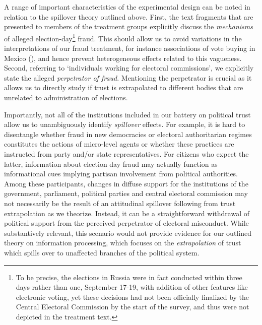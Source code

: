 \documentclass[11pt, ngerman,english,a4]{article}
\begin{document}
\doublespacing


A range of important characteristics of the experimental design can be noted in relation to the spillover theory outlined above.
First, the text fragments that are presented to members of the treatment groups explicitly discuss the \textit{mechanisms} of alleged election-day\footnote{To be precise, the elections in Russia were in fact conducted within three days rather than one, September 17-19, with addition of other features like electronic voting, yet these decisions had not been officially finalized by the Central Electoral Commission by the start of the survey, and thus were not depicted in the treatment text.} fraud. 
This should allow us to avoid variations in the interpretations of our fraud treatment, for instance associations of vote buying in Mexico (\citealt{Cantu2019a}), and hence prevent heterogeneous effects related to this vagueness. 
Second, referring to `individuals working for electoral commissions', we explicitly state the alleged \textit{perpetrator of fraud}. 
Mentioning the perpetrator is crucial as it allows us to directly study if trust is extrapolated to different bodies that are unrelated to administration of elections. 

Importantly, not all of the institutions included in our battery on political trust allow us to unambiguously identify \textit{spillover} effects. 
For example, it is hard to disentangle whether fraud in new democracies or electoral authoritarian regimes constitutes the actions of micro-level agents or whether these practices are instructed from party and/or state representatives. 
For citizens who expect the latter, information about election day fraud may actually function as informational cues implying partisan involvement from political authorities. 
Among these participants, changes in diffuse support for the institutions of the government, parliament, political parties and central electoral commission may not necessarily be the result of an attitudinal spillover following from trust extrapolation as we theorize.
Instead, it can be a straightforward withdrawal of political support from the perceived perpetrator of electoral misconduct. 
While substantively relevant, this scenario would not provide evidence for our outlined theory on information processing, which focuses on the \textit{extrapolation} of trust which spills over to unaffected branches of the political system.
\end{document}
